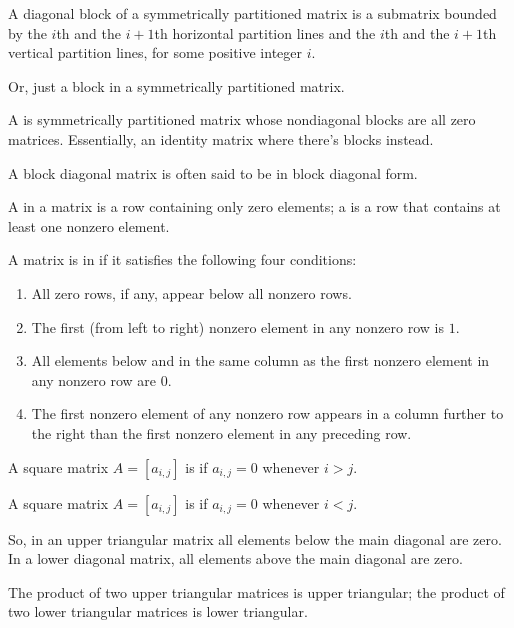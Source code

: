 \begin{definition}
  A diagonal block of a symmetrically partitioned matrix is a submatrix bounded by the $i$th and the $i + 1$th 
  horizontal partition lines and the $i$th and the $i + 1$th vertical partition lines, for some positive integer $i$.

  Or, just a block in a symmetrically partitioned matrix.
\end{definition}

\begin{definition}
  A  is symmetrically partitioned matrix whose nondiagonal blocks are all zero matrices.
  Essentially, an identity matrix where there's blocks instead.

  A block diagonal matrix is often said to be in block diagonal form.
\end{definition}

\begin{definition}
  A  in a matrix is a row containing only zero elements; a  is a row that
  contains at least one nonzero element.
\end{definition}

\begin{definition}
  A matrix is in  if it satisfies the following four conditions:
  \begin{enumerate}
    \item All zero rows, if any, appear below all nonzero rows.
    \item The first (from left to right) nonzero element in any nonzero row is $1$.
    \item All elements below and in the same column as the first nonzero element in any nonzero row are $0$.
    \item The first nonzero element of any nonzero row appears in a column further to the right than the first
      nonzero element in any preceding row.
  \end{enumerate}
\end{definition}

\begin{definition}
  A square matrix $A = \left[a_{i, j}\right]$ is  if $a_{i, j} = 0$ whenever $i > j$.

  A square matrix $A = \left[a_{i, j}\right]$ is  if $a_{i, j} = 0$ whenever $i < j$.
\end{definition}

So, in an upper triangular matrix all elements below the main diagonal are zero.
In a lower diagonal matrix, all elements above the main diagonal are zero.

\begin{theorem}
  The product of two upper triangular matrices is upper triangular; 
  the product of two lower triangular matrices is lower triangular. 
\end{theorem}



